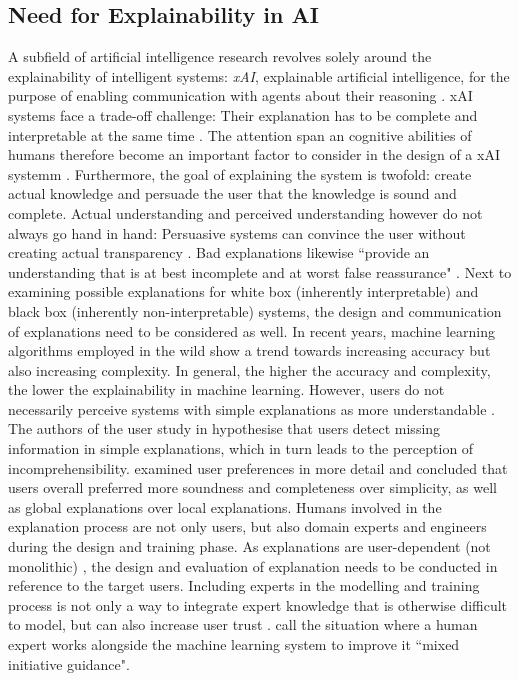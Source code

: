 \subsection{Need for Explainability in AI}
A subfield of artificial intelligence research revolves solely around the explainability of intelligent systems: \textit{xAI}, explainable artificial intelligence, for the purpose of enabling communication with agents about their reasoning \cite{hendricks2018generating}. xAI systems face a trade-off challenge: Their explanation has to be complete and interpretable at the same time \cite{gilpin2018explaining}. The attention span an cognitive abilities of humans therefore become an important factor to consider in the design of a xAI systemm \cite{kulesza2013too}. Furthermore, the goal of explaining the system is twofold: create actual knowledge and persuade the user that the knowledge is sound and complete. Actual understanding and perceived understanding however do not always go hand in hand: Persuasive systems can convince the user without creating actual transparency \cite{gilpin2018explaining}. Bad explanations likewise ``provide an understanding that is at best incomplete and at worst false reassurance" \cite{burrell2016machine}. Next to examining possible explanations for white box (inherently interpretable) and black box (inherently non-interpretable) systems, the design and communication of explanations need to be considered as well. \cite{guidotti2018survey}\newline
In recent years, machine learning algorithms employed in the wild show a trend towards increasing accuracy but also increasing complexity. In general, the higher the accuracy and complexity, the lower the explainability \cite{richardson2018survey} \cite{chen2018learning} in machine learning. However, users do not necessarily perceive systems with simple explanations as more understandable \cite{allahyari2011user}. The authors of the user study in \cite{allahyari2011user} hypothesise that users detect missing information in simple explanations, which in turn leads to the perception of incomprehensibility. \cite{van2018contrastive} examined user preferences in more detail and concluded that users overall preferred more soundness and completeness over simplicity, as well as global explanations over local explanations.\newline
Humans involved in the explanation process are not only users, but also domain experts and engineers during the design and training phase. As explanations are user-dependent (not monolithic) \cite{preece2018asking}, the design and evaluation of explanation needs to be conducted in reference to the target users. Including experts in the modelling and training process is not only a way to integrate expert knowledge that is otherwise difficult to model, but can also increase user trust \cite{ventocilla2018taxonomy}. \cite{liu2017towards} call the situation where a human expert works alongside the machine learning system to improve it ``mixed initiative guidance". \newline

